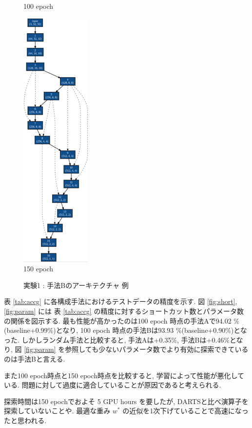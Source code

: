 \begin{figure}[tb]
\begin{minipage}{0.3\hsize}
\begin{center}
    100 epoch
 	\end{center}
 \end{minipage}
 \begin{minipage}{0.3\hsize}
 	\begin{center}
    \includegraphics[clip,scale=0.8]{./fig/04.exp/b150.png}\\
    150 epoch
 	\end{center}
 \end{minipage}
 \caption{実験1 : 手法Bのアーキテクチャ 例}
 \label{fig:exp1_b}
\end{figure}

表 \ref{tab:accg} に各構成手法におけるテストデータの精度を示す.
図 \ref{fig:short}, \ref{fig:param} には
表 \ref{tab:accg} の精度に対するショートカット数とパラメータ数の関係を図示する.
最も性能が高かったのは100 epoch 時点の手法Aで94.02 \%(baseline+0.99\%)となり,
100 epoch 時点の手法Bは93.93 \%(baseline+0.90\%)となった.
しかしランダム手法と比較すると, 手法Aは+0.35\%, 手法Bは+0.46\%となり,
図 \ref{fig:param} を参照しても少ないパラメータ数でより有効に探索できているのは手法Bと言える.

また100 epoch時点と150 epoch時点を比較すると, 学習によって性能が悪化している.
問題に対して過度に適合していることが原因であると考えられる.

探索時間は150 epochでおよそ 5 GPU hours を要したが, DARTSと比べ演算子を探索していないことや.
最適な重み $w^*$ の近似を1次下げていることで高速になったと思われる.








